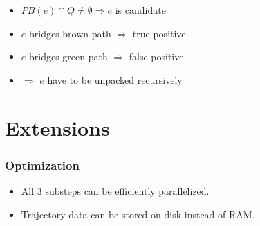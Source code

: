\documentclass[10pt, t,
aspectratio=1610,%
]{beamer}
\newcommand{\getAssociatedTrajectories}{GetAssociatedTrajectories\xspace}
\begin{document}
\begin{frame}
\begin{minipage}[t]{0.45\textwidth}
	\end{minipage}
	\hfill
	\begin{minipage}[t]{0.45\textwidth}
		\vspace{0pt}
		\begin{itemize}
			\item<2-> $PB(e) \cap Q \neq \emptyset \Rightarrow e$ is candidate
			\item<3-> $e$ bridges brown path  $\Rightarrow$ true positive
			\item<4-> $e$ bridges green path  $\Rightarrow$ false positive
			\item<5-> $\Rightarrow$ $e$ have to be unpacked recursively
		\end{itemize}
	\end{minipage}
\end{frame}

%

\section{Extensions}

\begin{frame}
	\frametitle{Optimization}
	\begin{itemize}
		\item<1-> All 3 substeps can be efficiently parallelized.
		\item<2-> Trajectory data can be stored on disk instead of RAM.
	\end{itemize}
\end{frame}
\end{document}

